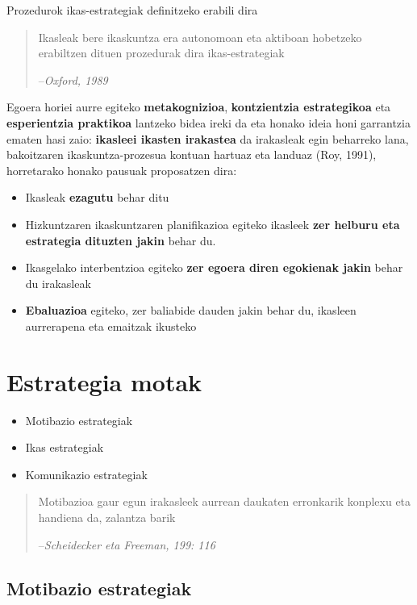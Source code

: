 \documentclass[]{book}
\providecommand{\tightlist}{%
  \setlength{\itemsep}{0pt}\setlength{\parskip}{0pt}}
\begin{document}
Prozedurok ikas-estrategiak definitzeko erabili dira

\begin{quote}
Ikasleak bere ikaskuntza era autonomoan eta aktiboan hobetzeko erabiltzen dituen prozedurak dira ikas-estrategiak

--\emph{Oxford, 1989}
\end{quote}

Egoera horiei aurre egiteko \textbf{metakognizioa}, \textbf{kontzientzia estrategikoa} eta \textbf{esperientzia praktikoa} lantzeko bidea ireki da eta honako ideia honi garrantzia ematen hasi zaio: \textbf{ikasleei ikasten irakastea} da irakasleak egin beharreko lana, bakoitzaren ikaskuntza-prozesua kontuan hartuaz eta landuaz (Roy, 1991), horretarako honako pausuak proposatzen dira:

\begin{itemize}
\tightlist
\item
  Ikasleak \textbf{ezagutu} behar ditu
\item
  Hizkuntzaren ikaskuntzaren planifikazioa egiteko ikasleek \textbf{zer helburu eta estrategia dituzten jakin} behar du.
\item
  Ikasgelako interbentzioa egiteko \textbf{zer egoera diren egokienak jakin} behar du irakasleak
\item
  \textbf{Ebaluazioa} egiteko, zer baliabide dauden jakin behar du, ikasleen aurrerapena eta emaitzak ikusteko
\end{itemize}

\hypertarget{estrategia-motak}{%
\section{Estrategia motak}\label{estrategia-motak}}

\begin{itemize}
\tightlist
\item
  Motibazio estrategiak
\item
  Ikas estrategiak
\item
  Komunikazio estrategiak
\end{itemize}

\begin{quote}
Motibazioa gaur egun irakasleek aurrean daukaten erronkarik konplexu eta handiena da, zalantza barik

--\emph{Scheidecker eta Freeman, 199: 116}
\end{quote}

\hypertarget{motibazio-estrategiak}{%
\subsection{Motibazio estrategiak}\label{motibazio-estrategiak}}
\end{document}
